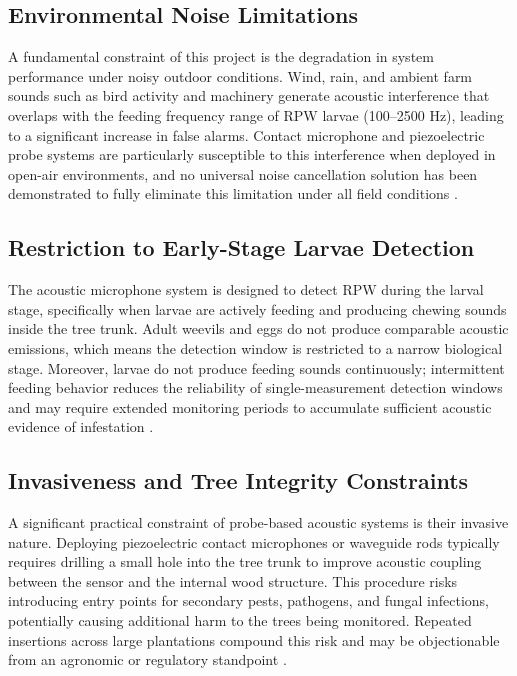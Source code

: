 \documentclass[12pt,a4paper,oneside]{memoir}
\begin{document}
\subsection{Environmental Noise Limitations}
 
A fundamental constraint of this project is the degradation in system performance under noisy outdoor conditions. Wind, rain, and ambient farm sounds such as bird activity and machinery generate acoustic interference that overlaps with the feeding frequency range of RPW larvae (100--2500 Hz), leading to a significant increase in false alarms. Contact microphone and piezoelectric probe systems are particularly susceptible to this interference when deployed in open-air environments, and no universal noise cancellation solution has been demonstrated to fully eliminate this limitation under all field conditions \cite{pinhas2008,karar2022,ashry2022cnn}.
 
\subsection{Restriction to Early-Stage Larvae Detection}
 
The acoustic microphone system is designed to detect RPW during the larval stage, specifically when larvae are actively feeding and producing chewing sounds inside the tree trunk. Adult weevils and eggs do not produce comparable acoustic emissions, which means the detection window is restricted to a narrow biological stage. Moreover, larvae do not produce feeding sounds continuously; intermittent feeding behavior reduces the reliability of single-measurement detection windows and may require extended monitoring periods to accumulate sufficient acoustic evidence of infestation \cite{sutanto2023,wang2021}.
 
\subsection{Invasiveness and Tree Integrity Constraints}
 
A significant practical constraint of probe-based acoustic systems is their invasive nature. Deploying piezoelectric contact microphones or waveguide rods typically requires drilling a small hole into the tree trunk to improve acoustic coupling between the sensor and the internal wood structure. This procedure risks introducing entry points for secondary pests, pathogens, and fungal infections, potentially causing additional harm to the trees being monitored. Repeated insertions across large plantations compound this risk and may be objectionable from an agronomic or regulatory standpoint \cite{pinhas2008,karar2022}.
 
\end{document}
